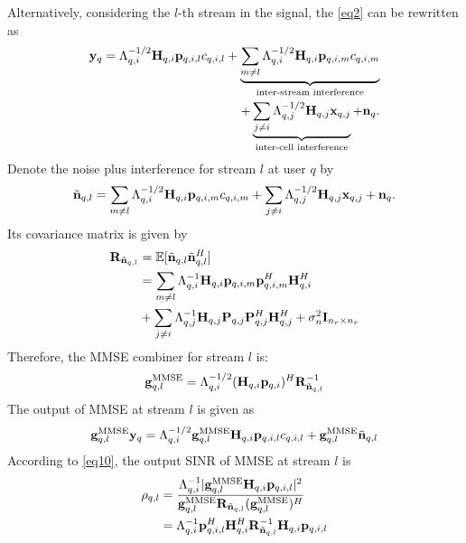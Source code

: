 \documentclass[10pt,conference]{IEEEtran}
\begin{document}
Alternatively, considering the $l$-th stream in the signal, the \eqref{eq2}
can be rewritten as
\begin{equation}
    \begin{split}
        {\bf{y}}_{q} = \Lambda_{q,i}^{-1/2} {\bf{H}}_{q,i} {\bf{p}}_{q,i,l} c_{q,i,l} + \underbrace{\sum_{m \neq l} \Lambda_{q,i}^{-1/2} {\bf{H}}_{q,i} {\bf{p}}_{q,i,m} c_{q,i,m}}_{\text{inter-stream interference}} \\
        + \underbrace{\sum_{j \neq i} \Lambda_{q,j}^{-1/2} {\bf{H}}_{q,j} {\bf{x}}_{q,j}}_{\text{inter-cell interference}} + {\bf{n}}_{q}. \label{eq6}
    \end{split}
\end{equation}
Denote the noise plus interference for stream $l$ at user $q$ by
\begin{equation}
    \tilde{{\bf{n}}}_{q,l} = \sum_{m \neq l} \Lambda_{q,i}^{-1/2} {\bf{H}}_{q,i} {\bf{p}}_{q,i,m} c_{q,i,m} 
        + \sum_{j \neq i} \Lambda_{q,j}^{-1/2} {\bf{H}}_{q,j} {\bf{x}}_{q,j} + {\bf{n}}_{q}.\label{eq7}
\end{equation}
Its covariance matrix is given by
\begin{equation}
    \begin{split}
        {\bf{R}}_{\tilde{{\bf{n}}}_{q,l}} & = \mathbb{E}[\tilde{{\bf{n}}}_{q,l} \tilde{{\bf{n}}}_{q,l}^H]\\
        & = \sum_{m \neq l} \Lambda_{q,i}^{-1} {\bf{H}}_{q,i} {\bf{p}}_{q,i,m} {\bf{p}}_{q,i,m}^H {\bf{H}}_{q,i}^H \\
        & + \sum_{j \neq i} \Lambda_{q,j}^{-1} {\bf{H}}_{q,j} {\bf{P}}_{q,j} {\bf{P}}_{q,j}^H {\bf{H}}_{q,j}^H + \sigma_n^2 {\bf{I}}_{n_r \times n_r}  \label{eq8}  
    \end{split}
\end{equation}
Therefore, the MMSE combiner for stream $l$ is:
\begin{equation}
    {\bf{g}}_{q,l}^{\text{MMSE}} = \Lambda_{q,i}^{-1/2}({\bf{H}}_{q,i} {\bf{p}}_{q,i})^H {\bf{R}}_{\tilde{{\bf{n}}}_{q,l}}^{-1} \label{eq9}
\end{equation}
The output of MMSE at stream $l$ is given as
\begin{equation}
    {\bf{g}}_{q,l}^{\text{MMSE}} {\bf{y}}_q = \Lambda_{q,i}^{-1/2} {\bf{g}}_{q,l}^{\text{MMSE}} {\bf{H}}_{q,i} {\bf{p}}_{q,i,l} c_{q,i,l} + {\bf{g}}_{q,l}^{\text{MMSE}} \tilde{{\bf{n}}}_{q,l} \label{eq10}
\end{equation}
According to \eqref{eq10}, the output SINR of MMSE at stream $l$ is
\begin{equation}
    \begin{split}
        \rho_{q,l} & = \frac{\Lambda_{q,i}^{-1} |{\bf{g}}_{q,l}^{\text{MMSE}} {\bf{H}}_{q,i} {\bf{p}}_{q,i,l}|^2} {{\bf{g}}_{q,l}^{\text{MMSE}} {\bf{R}}_{\tilde{{\bf{n}}}_{q,l}} ({\bf{g}}_{q,l}^{\text{MMSE}})^H}\\
        & = \Lambda_{q,i}^{-1} {\bf{p}}_{q,i,l}^H {\bf{H}}_{q,i}^H {\bf{R}}_{\tilde{{\bf{n}}}_{q,l}}^{-1} {\bf{H}}_{q,i} {\bf{p}}_{q,i,l} \label{eq11}
    \end{split}
\end{equation}
\end{document}
